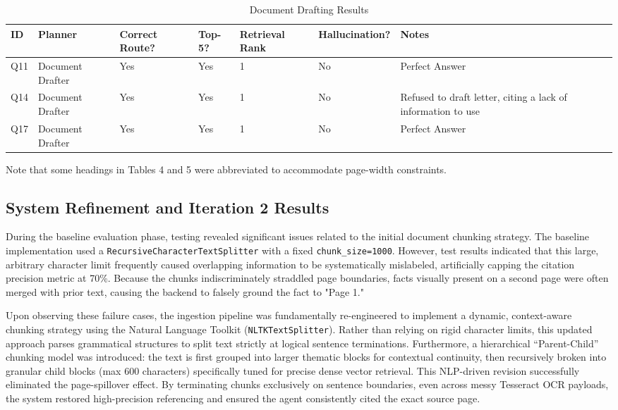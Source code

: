 \documentclass[11pt,a4paper]{article}
\begin{document}
    \begin{table}[H]
    \centering
    \begin{tabularx}{\textwidth}{|l|l|X|X|X|X|X|}
    \hline
        ID & Planner & Correct Route? & Top-5? & Retrie\-val Rank & Hal\-lu\-ci\-na\-tion? & Notes \\ \hline
        Q11 & Document Drafter & Yes & Yes & 1 & No & Perfect Answer \\ \hline
        Q14 & Document Drafter & Yes & Yes & 1 & No & Refused to draft letter, citing a lack of information to use \\ \hline
        Q17 & Document Drafter & Yes & Yes & 1 & No & Perfect Answer \\ \hline
    \end{tabularx}

    \caption{Document Drafting Results}
\end{table}

Note that some headings in Tables 4 and 5 were abbreviated to accommodate page-width constraints.

\subsection{System Refinement and Iteration 2 Results}

During the baseline evaluation phase, testing revealed significant issues related to the initial document chunking strategy. The baseline implementation used a \texttt{RecursiveCharacterTextSplitter} with a fixed \texttt{chunk\_size=1000}. However, test results indicated that this large, arbitrary character limit frequently caused overlapping information to be systematically mislabeled, artificially capping the citation precision metric at 70\%. Because the chunks indiscriminately straddled page boundaries, facts visually present on a second page were often merged with prior text, causing the backend to falsely ground the fact to "Page 1."

Upon observing these failure cases, the ingestion pipeline was fundamentally re-engineered to implement a dynamic, context-aware chunking strategy using the Natural Language Toolkit (\texttt{NLTKTextSplitter}). Rather than relying on rigid character limits, this updated approach parses grammatical structures to split text strictly at logical sentence terminations. Furthermore, a hierarchical ``Parent-Child'' chunking model was introduced: the text is first grouped into larger thematic blocks for contextual continuity, then recursively broken into granular child blocks (max 600 characters) specifically tuned for precise dense vector retrieval. This NLP-driven revision successfully eliminated the page-spillover effect. By terminating chunks exclusively on sentence boundaries, even across messy Tesseract OCR payloads, the system restored high-precision referencing and ensured the agent consistently cited the exact source page.
\end{document}
